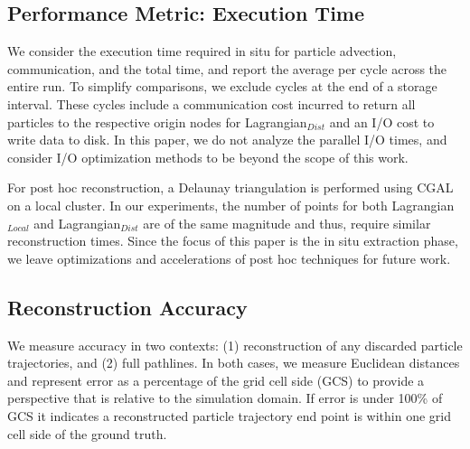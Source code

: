 \subsection{Performance Metric: Execution Time}
%
We consider the execution time required in situ for particle advection, communication, and the total time, and report the average per cycle across the entire run.
%
To simplify comparisons, we exclude cycles at the end of a storage interval. 
%
These cycles include a communication cost incurred to return all particles to the respective origin nodes for Lagrangian$_{Dist}$ and an I/O cost to write data to disk.
%
In this paper, we do not analyze the parallel I/O times, and consider I/O optimization methods to be beyond the scope of this work.

For post hoc reconstruction, a Delaunay triangulation is performed using CGAL~\cite{2020cgal} on a local cluster.
%
In our experiments, the number of points for both Lagrangian$_{Local}$ and Lagrangian$_{Dist}$ are of the same magnitude and thus, require similar reconstruction times.
%
%
%
%
%
%
Since the focus of this paper is the in situ extraction phase, we leave optimizations and accelerations of post hoc techniques for future work.
\subsection{Reconstruction Accuracy}
We measure accuracy in two contexts: (1) reconstruction of any discarded particle trajectories, and (2) full pathlines.  
%
In both cases, we measure Euclidean distances and represent error as a percentage of the grid cell side (GCS) to provide a perspective that is relative to the simulation domain.
%
If error is under 100\% of GCS it indicates a reconstructed particle trajectory end point is within one grid cell side of the ground truth.

